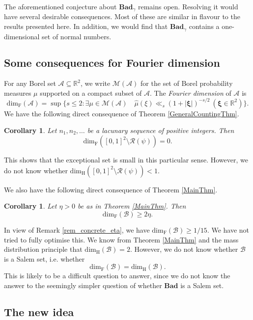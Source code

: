 \documentclass[12pt, reqno]{amsart}
\newtheorem{cor}[thm]{Corollary}
\theoremstyle{definition}
\theoremstyle{remark}
\numberwithin{equation}{section}
\def\gam{{\gamma}} \def\Gam{{\Gamma}}
\def\le{\leqslant} \def\ge{\geqslant}
\def \bR {\mathbb R}
\def \bxi {{\boldsymbol{\xi}}}
\def \cA {\mathcal A}
\def \cB {\mathcal B}
\def \cM {\mathcal M}
\def \cR {\mathcal R}
\def \dim {\mathrm{dim}}
\def \Bad {{\mathrm{\mathbf{Bad}}}}
\begin{document}
	\bigskip
	
	The aforementioned conjecture about $\Bad_\gam$ remains open. Resolving it would have several desirable consequences. Most of these are similar in flavour to the results presented here. In addition, we would find that $\Bad_\gam$ contains a one-dimensional set of normal numbers.
	
	\subsection{Some consequences for Fourier dimension}
	
	For any Borel set $\cA \subseteq \bR^2$, we write $\cM(\cA)$ for the set of Borel probability measures $\mu$ supported on a compact subset of $\cA$. 
	The \emph{Fourier dimension} of $\cA$ is 
	\[
	\dim_{\mathrm{F}}(\cA) = \sup \{
	s \le 2:
	\exists \mu \in \cM(\cA)
	\quad
	\widehat \mu(\xi) \ll_s 
	(1+|\bxi|)^{-s/2} \:
	(\bxi \in \bR^2) \}.
	\]
	We have the following direct consequence of Theorem \ref{GeneralCountingThm}. 
	
	\begin{cor} Let $n_1, n_2, \ldots$ be a lacunary sequence of positive integers. Then 
		\[
		\dim_{\mathrm{F}}
		([0,1]^2 \setminus \cR(\psi)) = 0.
		\]
	\end{cor}
	
	\noindent This shows that the exceptional set is small in this particular sense. However, we do not know whether $
	\dim_{\mathrm{H}}
	([0,1]^2 \setminus \cR(\psi)) < 1.$
	
	We also have the following direct consequence of Theorem \ref{MainThm}.
	
	\begin{cor} Let $\eta > 0$ be as in Theorem \ref{MainThm}. Then
		\[
		\dim_{\mathrm{F}}(\cB)
		\ge 2\eta.
		\]
	\end{cor}
	
	In view of Remark \ref{rem_concrete_eta}, we have $\dim_{\mathrm{F}}(\cB) \ge 1/15$. We have not tried to fully optimise this. We know from Theorem \ref{MainThm} and the mass distribution principle that $\dim_{\mathrm{H}}(\cB) = 2$. However, we do not know whether $\cB$ is a Salem set, i.e. whether
	\[
	\dim_{\mathrm{F}}(\cB)
	= \dim_{\mathrm{H}}(\cB).
	\]
	This is likely to be a difficult question to answer, since we do not know the answer to the seemingly simpler question of whether $\Bad$ is a Salem set.
	
	\subsection{The new idea}
	
\end{document}
